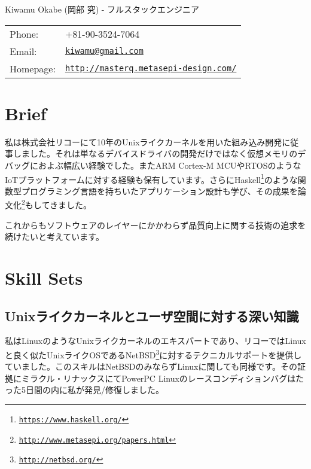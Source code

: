\documentclass[letterpaper]{article}
\def\name{Kiwamu Okabe (岡部 究) - フルスタックエンジニア}
\begin{document}
{\huge \name}


\vspace{0.25in}

\begin{minipage}{0.3\linewidth}
  \begin{tabular}{ll}
    Phone: & +81-90-3524-7064 \\
    Email: & \href{mailto:kiwamu@gmail.com}{\tt kiwamu@gmail.com} \\
    Homepage: & \href{http://masterq.metasepi-design.com/}{\tt http://masterq.metasepi-design.com/} \\
  \end{tabular}
\end{minipage}

\section*{Brief}

私は株式会社リコーにて10年のUnixライクカーネルを用いた組み込み開発に従事しました。それは単なるデバイスドライバの開発だけではなく仮想メモリのデバッグにおよぶ幅広い経験でした。またARM Cortex-M MCUやRTOSのようなIoTプラットフォームに対する経験も保有しています。さらにHaskell\footnote{\href{https://www.haskell.org/}{\tt https://www.haskell.org/}}のような関数型プログラミング言語を持ちいたアプリケーション設計も学び、その成果を論文化\footnote{\href{http://www.metasepi.org/papers.html}{\tt http://www.metasepi.org/papers.html}}もしてきました。

これからもソフトウェアのレイヤーにかかわらず品質向上に関する技術の追求を続けたいと考えています。

\section*{Skill Sets}

\subsection*{Unixライクカーネルとユーザ空間に対する深い知識}

私はLinuxのようなUnixライクカーネルのエキスパートであり、リコーではLinuxと良く似たUnixライクOSであるNetBSD\footnote{\href{http://netbsd.org/}{\tt http://netbsd.org/}}に対するテクニカルサポートを提供していました。このスキルはNetBSDのみならずLinuxに関しても同様です。その証拠にミラクル・リナックスにてPowerPC Linuxのレースコンディションバグはたった5日間の内に私が発見/修復しました。
\end{document}
